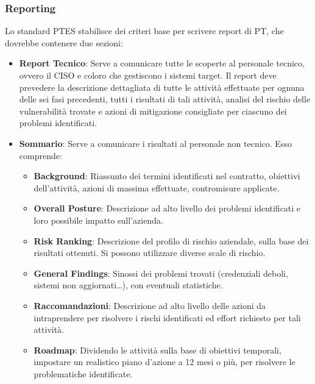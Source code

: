 \documentclass{article}
\begin{document}
\subsubsection{Reporting}
Lo standard PTES stabilisce dei criteri base per scrivere report di PT, che dovrebbe contenere due sezioni:
\begin{itemize}
    \item \textbf{Report Tecnico}: Serve a comunicare tutte le scoperte al personale tecnico, ovvero il CISO e coloro che gestiscono i sistemi target. Il report deve prevedere la descrizione dettagliata di tutte 
    le attività effettuate per ognuna delle sei fasi precedenti, tutti i risultati di tali attività, analisi del rischio delle vulnerabilità trovate e azioni di mitigazione consigliate per ciascuno dei problemi 
    identificati.

    \item \textbf{Sommario}: Serve a comunicare i risultati al personale non tecnico. Esso comprende:
    \begin{itemize}
        \item \textbf{Background}: Riassunto dei termini identificati nel contratto, obiettivi dell’attività, azioni di massima effettuate, contromisure applicate.

        \item \textbf{Overall Posture}: Descrizione ad alto livello dei problemi identificati e loro possibile impatto sull’azienda.
        
        \item \textbf{Risk Ranking}: Descrizione del profilo di rischio aziendale, sulla base dei risultati ottenuti. Si possono utilizzare diverse scale di rischio.
        
        \item \textbf{General Findings}: Sinossi dei problemi trovati (credenziali deboli, sistemi non aggiornati…), con eventuali statistiche.
        
        \item \textbf{Raccomandazioni}: Descrizione ad alto livello delle azioni da intraprendere per risolvere i rischi identificati ed effort richiesto per tali attività.
        
        \item \textbf{Roadmap}: Dividendo le attività sulla base di obiettivi temporali, impostare un realistico piano d’azione a 12 mesi o più, per risolvere le problematiche identificate.
    \end{itemize}
\end{itemize}
\end{document}
